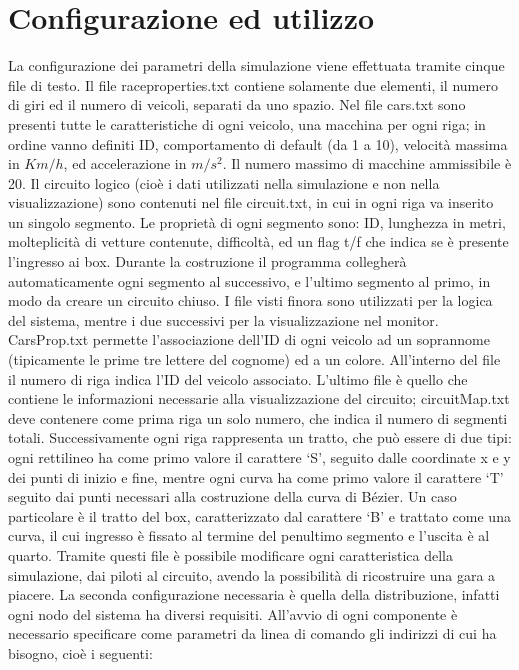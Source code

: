 
\chapter{Configurazione ed utilizzo} %

\label{Chapter9} %


La configurazione dei parametri della simulazione viene effettuata tramite cinque file di testo.
Il file race\textunderscore properties.txt contiene solamente due elementi, il numero di giri ed il numero di veicoli, separati da uno spazio.
Nel file cars.txt sono presenti tutte le caratteristiche di ogni veicolo, una macchina per ogni riga; in ordine vanno definiti ID, comportamento di default (da 1 a 10), velocità massima in $Km/h$, ed accelerazione in $m/s^2$. Il numero massimo di macchine ammissibile è 20.
Il circuito logico (cioè i dati utilizzati nella simulazione e non nella visualizzazione) sono contenuti nel file circuit.txt, in cui in ogni riga va inserito un singolo segmento. Le proprietà di ogni segmento sono: ID, lunghezza in metri, molteplicità di vetture contenute, difficoltà, ed un flag t/f che indica se è presente l’ingresso ai box.
Durante la costruzione il programma collegherà automaticamente ogni segmento al successivo, e l’ultimo segmento al primo, in modo da creare un circuito chiuso.
I file visti finora sono utilizzati per la logica del sistema, mentre i due successivi per la visualizzazione nel monitor.
CarsProp.txt permette l’associazione dell’ID di ogni veicolo ad un soprannome (tipicamente le prime tre lettere del cognome) ed a un colore. All’interno del file il numero di riga indica l’ID del veicolo associato.
L’ultimo file è quello che contiene le informazioni necessarie alla visualizzazione del circuito; circuitMap.txt deve contenere come prima riga un solo numero, che indica il numero di segmenti totali. Successivamente ogni riga rappresenta un tratto, che può essere di due tipi: ogni rettilineo ha come primo valore il carattere ‘S’, seguito dalle coordinate x e y dei punti di inizio e fine, mentre ogni curva ha come primo valore il carattere ‘T’ seguito dai punti necessari alla costruzione della curva di Bézier. Un caso particolare è il tratto del box, caratterizzato dal carattere ‘B’ e trattato come una curva, il cui ingresso è fissato al termine del penultimo segmento e l’uscita è al quarto.
Tramite questi file è possibile modificare ogni caratteristica della simulazione, dai piloti al circuito, avendo la possibilità di ricostruire una gara a piacere.
La seconda configurazione necessaria è quella della distribuzione, infatti ogni nodo del sistema ha diversi requisiti. All’avvio di ogni componente è necessario specificare come parametri da linea di comando gli indirizzi di cui ha bisogno, cioè i seguenti:

